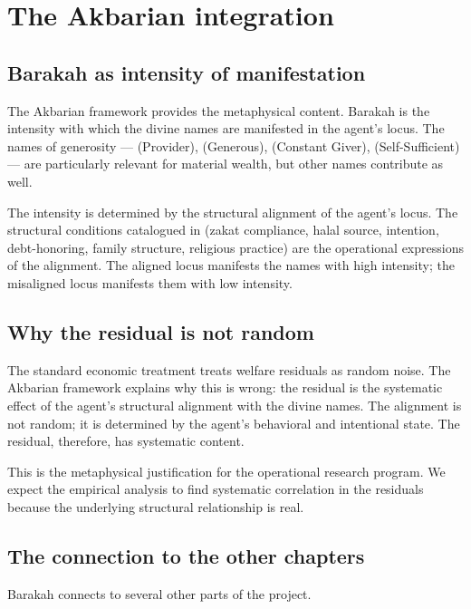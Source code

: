 \section{The Akbarian integration}
\label{sec:bar-akbarian}

\subsection{Barakah as intensity of manifestation}

The Akbarian framework provides the metaphysical content. Barakah
is the intensity with which the divine names are manifested in
the agent's locus. The names of generosity --- 
(Provider),  (Generous),  (Constant
Giver),  (Self-Sufficient) --- are particularly
relevant for material wealth, but other names contribute as well.

The intensity is determined by the structural alignment of the
agent's locus. The structural conditions catalogued in
 (zakat compliance, halal source,
intention, debt-honoring, family structure, religious practice)
are the operational expressions of the alignment. The aligned
locus manifests the names with high intensity; the misaligned
locus manifests them with low intensity.

\subsection{Why the residual is not random}

The standard economic treatment treats welfare residuals as
random noise. The Akbarian framework explains why this is wrong:
the residual is the systematic effect of the agent's structural
alignment with the divine names. The alignment is not random; it
is determined by the agent's behavioral and intentional state.
The residual, therefore, has systematic content.

This is the metaphysical justification for the operational
research program. We expect the empirical analysis to find
systematic correlation in the residuals because the underlying
structural relationship is real.

\subsection{The connection to the other chapters}

Barakah connects to several other parts of the project.

